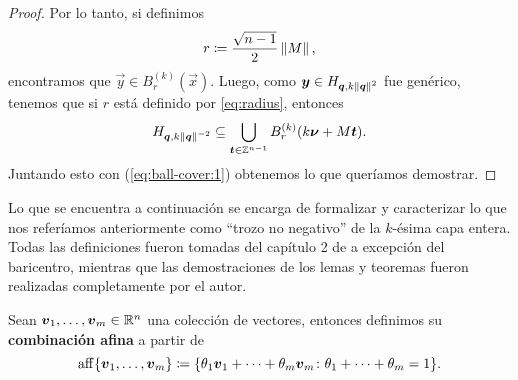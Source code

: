 \begin{proof}
	Por lo tanto, si definimos
	\begin{equation}
		\label{eq:radius}
		r \coloneq \frac{\sqrt{n - 1}}{2}\left\lVert M \right\rVert,
	\end{equation}
	encontramos que $\vec{y} \in B_r^{(k)}(\vec{x})$. Luego, como $\boldsymbol{y} \in H_{\boldsymbol{q},
	k\left\lVert \boldsymbol{q} \right\rVert^2}$ fue genérico, tenemos que si $r$ está definido por \eqref{eq:radius},
	entonces
	\begin{equation}
		\label{eq:ball-cover:2}
		H_{\boldsymbol{q}, k\left\lVert \boldsymbol{q} \right\rVert^{-2}} \subseteq
		\bigcup_{\boldsymbol{t} \in \mathbb{Z}^{n-1}}B_r^{(k)}(k\boldsymbol{\nu} + M\boldsymbol{t}).
	\end{equation}
	Juntando esto con (\ref{eq:ball-cover:1}) obtenemos lo que queríamos demostrar.
\end{proof}

Lo que se encuentra a continuación se encarga de formalizar y caracterizar lo
que nos referíamos anteriormente como ``trozo no negativo'' de la $k$-ésima
capa entera. Todas las definiciones fueron tomadas del capítulo 2 de
\cite{boyd} a excepción del baricentro, mientras que las demostraciones de los
lemas y teoremas fueron realizadas completamente por el autor.
\begin{definition}
	\label{def:aff}
	Sean $\boldsymbol{v}_1, \ldots, \boldsymbol{v}_m \in \mathbb{R}^n$ una colección de vectores,
	entonces definimos su \textbf{combinación afina} a partir de
	\begin{equation*}
		\operatorname{aff}\lbrace \boldsymbol{v}_1, \ldots, \boldsymbol{v}_m \rbrace \coloneq \lbrace \theta_1\boldsymbol{v}_1 + \cdots + \theta_m\boldsymbol{v}_m
		\colon \theta_1 + \cdots + \theta_m = 1 \rbrace.
	\end{equation*}
\end{definition}

